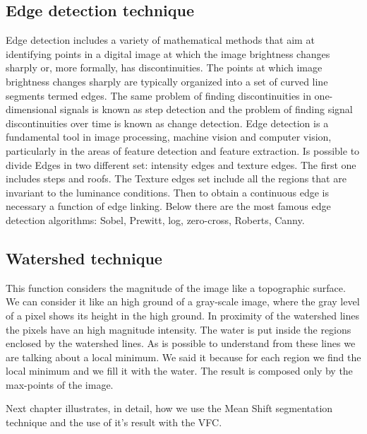 \subsection{Edge detection technique}
Edge detection includes a variety of mathematical methods that aim at identifying points in a digital image at which the image brightness changes sharply or, more formally, has discontinuities. The points at which image brightness changes sharply are typically organized into a set of curved line segments termed edges. The same problem of finding discontinuities in one-dimensional signals is known as step detection and the problem of finding signal discontinuities over time is known as change detection. Edge detection is a fundamental tool in image processing, machine vision and computer vision, particularly in the areas of feature detection and feature extraction.\cite{edge} Is possible to divide Edges in two different set: intensity edges and texture edges. The first one includes steps and roofs. The Texture edges set include all the regions that are invariant to the luminance conditions. Then to obtain a continuous edge is necessary a function of edge linking. Below there are the most famous edge detection algorithms: Sobel, Prewitt, log, zero-cross, Roberts, Canny.

\subsection{Watershed technique}
This function considers the magnitude of the image like a topographic surface. We can consider it like an high ground of a gray-scale image, where the gray level of a pixel shows its height in the high ground. In proximity of the watershed lines the pixels have an high magnitude intensity. The water is put inside the regions enclosed by the watershed lines. As is possible to understand from these lines we are talking about a local minimum. We said it because for each region we find the local minimum and we fill it with the water. The result is composed only by the max-points of the image.

\bigskip

Next chapter illustrates, in detail, how we use the Mean Shift segmentation technique and the use of it's result with the VFC.
